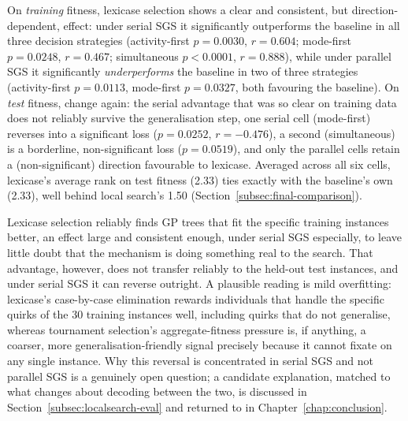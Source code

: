  On
\emph{training} fitness, lexicase selection shows a clear and consistent,
but direction-dependent, effect: under serial SGS it significantly
outperforms the baseline in all three decision strategies (activity-first
$p=0.0030$, $r=0.604$; mode-first $p=0.0248$, $r=0.467$; simultaneous
$p<0.0001$, $r=0.888$), while under parallel SGS it significantly
\emph{underperforms} the baseline in two of three strategies
(activity-first $p=0.0113$, mode-first $p=0.0327$, both favouring the
baseline). On \emph{test} fitness,  change again: the serial
advantage that was so clear on training data does not reliably survive the
generalisation step, one serial cell (mode-first) reverses into a
significant loss ($p=0.0252$, $r=-0.476$), a second (simultaneous) is a
borderline, non-significant loss ($p=0.0519$), and only the parallel cells
retain a (non-significant) direction favourable to lexicase. Averaged
across all six cells, lexicase's average rank on test fitness (2.33) ties
exactly with the baseline's own (2.33), well behind local search's 1.50
(Section~\ref{subsec:final-comparison}).

 Lexicase
selection reliably finds
GP trees that fit the specific training instances better, an effect large
and consistent enough, under serial SGS especially, to leave little doubt
that the mechanism is doing something real to the search. That advantage,
however, does not transfer reliably to the held-out test instances, and
under serial SGS it can reverse outright.  A plausible reading is mild
overfitting: lexicase's case-by-case elimination rewards individuals that
handle the specific quirks of the 30 training instances well, including
quirks that do not generalise, whereas tournament selection's
aggregate-fitness pressure is, if anything, a coarser, more
generalisation-friendly signal precisely because it cannot fixate on any
single instance. Why this reversal is concentrated in serial SGS and not
parallel SGS is a genuinely open question; a candidate explanation, matched
to what changes about decoding between the two, is discussed in
Section~\ref{subsec:localsearch-eval} and returned to in
Chapter~\ref{chap:conclusion}. 

